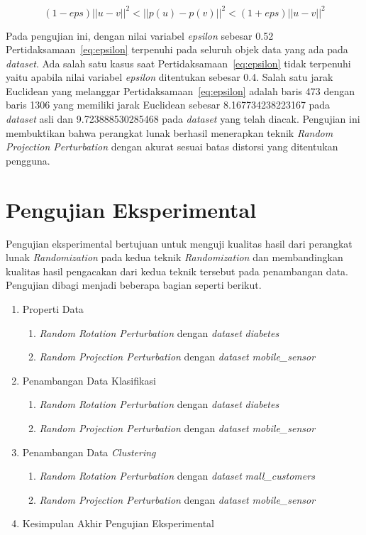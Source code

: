 \begin{equation}\label{eq:epsilon}
	(1-eps)||u - v||^{2}<||p(u) - p(v)||^{2}<(1+eps)||u - v||^{2}
\end{equation}

Pada pengujian ini, dengan nilai variabel \textit{epsilon} sebesar 0.52 Pertidaksamaan~\ref{eq:epsilon} terpenuhi pada seluruh objek data yang ada pada \textit{dataset}. Ada salah satu kasus saat Pertidaksamaan~\ref{eq:epsilon} tidak terpenuhi yaitu apabila nilai variabel \textit{epsilon} ditentukan sebesar 0.4. Salah satu jarak Euclidean yang melanggar Pertidaksamaan~\ref{eq:epsilon} adalah baris 473 dengan baris 1306 yang memiliki jarak Euclidean sebesar 8.167734238223167 pada \textit{dataset} asli dan 9.723888530285468 pada \textit{dataset} yang telah diacak. Pengujian ini membuktikan bahwa perangkat lunak berhasil menerapkan teknik \textit{Random Projection Perturbation} dengan akurat sesuai batas distorsi yang ditentukan pengguna.

\section{Pengujian Eksperimental}
\label{sec:pengujianeksperimental}

Pengujian eksperimental bertujuan untuk menguji kualitas hasil dari perangkat lunak \textit{Randomization} pada kedua teknik \textit{Randomization} dan membandingkan kualitas hasil pengacakan dari kedua teknik tersebut pada penambangan data. Pengujian dibagi menjadi beberapa bagian seperti berikut.

\begin{enumerate}
	\item Properti Data
	\begin{enumerate}
		\item \textit{Random Rotation Perturbation} dengan \textit{dataset} \textit{diabetes}
		\item \textit{Random Projection Perturbation} dengan \textit{dataset} \textit{mobile\_sensor}
	\end{enumerate}
	\item Penambangan Data Klasifikasi
	\begin{enumerate}
		\item \textit{Random Rotation Perturbation} dengan \textit{dataset} \textit{diabetes}
		\item \textit{Random Projection Perturbation} dengan \textit{dataset} \textit{mobile\_sensor}
	\end{enumerate}
	\item Penambangan Data \textit{Clustering}
	\begin{enumerate}
		\item \textit{Random Rotation Perturbation} dengan \textit{dataset} \textit{mall\_customers}
		\item \textit{Random Projection Perturbation} dengan \textit{dataset} \textit{mobile\_sensor}
	\end{enumerate}
	\item Kesimpulan Akhir Pengujian Eksperimental
\end{enumerate}

